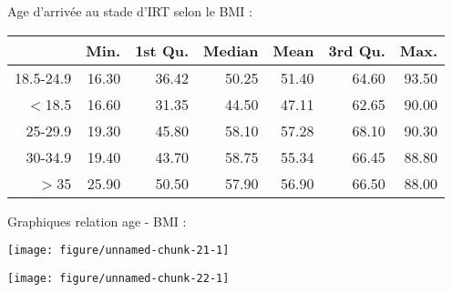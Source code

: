 \documentclass[11pt,a4paper]{article}\usepackage[]{graphicx}\usepackage[]{color}
\makeatletter
\def\maxwidth{ %
  \ifdim\Gin@nat@width>\linewidth
    \linewidth
  \else
    \Gin@nat@width
  \fi
}
\newenvironment{knitrout}{}{} %
\makeatother
\begin{document}
Age d'arrivée au stade d'IRT selon le BMI :

\begin{table}[H]
\centering
\begin{tabular}{rrrrrrr}
  \hline
 & Min. & 1st Qu. & Median & Mean & 3rd Qu. & Max. \\ 
  \hline
18.5-24.9 & 16.30 & 36.42 & 50.25 & 51.40 & 64.60 & 93.50 \\ 
  $<$18.5 & 16.60 & 31.35 & 44.50 & 47.11 & 62.65 & 90.00 \\ 
  25-29.9 & 19.30 & 45.80 & 58.10 & 57.28 & 68.10 & 90.30 \\ 
  30-34.9 & 19.40 & 43.70 & 58.75 & 55.34 & 66.45 & 88.80 \\ 
  $>$35 & 25.90 & 50.50 & 57.90 & 56.90 & 66.50 & 88.00 \\ 
   \hline
\end{tabular}
\end{table}


Graphiques relation age - BMI :

\begin{knitrout}
\color{fgcolor}
\texttt{[image: figure/unnamed-chunk-21-1]} 

\end{knitrout}

\begin{knitrout}
\color{fgcolor}
\texttt{[image: figure/unnamed-chunk-22-1]} 

\end{knitrout}
\end{document}
